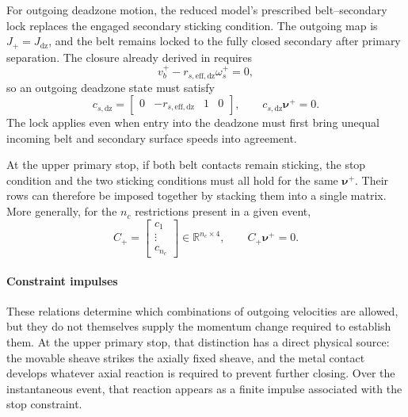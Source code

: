 \documentclass[11pt]{report}
\numberwithin{equation}{section}
\begin{document}
For outgoing deadzone motion, the reduced model's prescribed belt--secondary
lock replaces the engaged secondary sticking condition. The outgoing map is
\(J_+=J_{\mathrm{dz}}\), and the belt remains locked to the fully closed
secondary after primary separation. The closure already derived in
 requires
\begin{equation}
    v_b^+
    -
    r_{s,\mathrm{eff,dz}}\omega_s^+
    =0,
    \label{eq:finite_event_deadzone_lock_velocity}
\end{equation}
so an outgoing deadzone state must satisfy
\begin{equation}
    c_{s,\mathrm{dz}}
    =
    \begin{bmatrix}
        0 & -r_{s,\mathrm{eff,dz}} & 1 & 0
    \end{bmatrix},
    \qquad
    c_{s,\mathrm{dz}}\boldsymbol{\nu}^+=0.
    \label{eq:finite_event_deadzone_lock_constraint}
\end{equation}
The lock applies even when entry into the deadzone must first bring unequal
incoming belt and secondary surface speeds into agreement.

At the upper primary stop, if both belt contacts remain sticking, the stop
condition and the two sticking conditions must all hold for the same
\(\boldsymbol{\nu}^+\). Their rows can therefore be imposed together by
stacking them into a single matrix. More generally, for the \(n_c\)
restrictions present in a given event,
\begin{equation}
    C_+
    =
    \begin{bmatrix}
        c_1\\
        \vdots\\
        c_{n_c}
    \end{bmatrix}
    \in\mathbb{R}^{n_c\times4},
    \qquad
    C_+\boldsymbol{\nu}^+=0.
    \label{eq:finite_event_outgoing_constraints}
\end{equation}


\paragraph{Constraint impulses}

These relations determine which combinations of outgoing velocities are
allowed, but they do not themselves supply the momentum change required to
establish them.  At the upper primary stop, that distinction has a direct
physical source: the movable sheave strikes the axially fixed sheave, and
the metal contact develops whatever axial reaction is required to prevent
further closing.  Over the instantaneous event, that reaction appears as a
finite impulse associated with the stop constraint.
\end{document}
